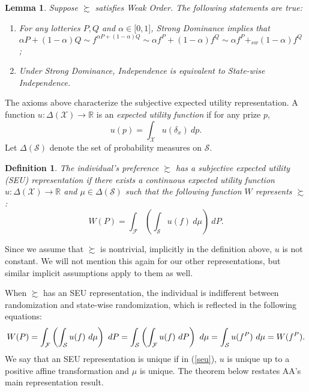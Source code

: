 \documentclass[12pt, notitlepage]{article}
\newtheorem{definition}{Definition}
\newtheorem{lemma}{Lemma}
\begin{document}
\begin{lemma}
\label{triangle}Suppose $\succsim $ satisfies Weak Order. The following
statements are true:

\begin{enumerate}
\item For any lotteries $P,Q$ and $\alpha \in \lbrack 0,1]$, Strong
Dominance implies that $\alpha P+(1-\alpha )Q\sim f^{\alpha P+(1-\alpha
)Q}\sim \alpha f^{P}+(1-\alpha )f^{Q}\sim \alpha f^{P}+_{sw}(1-\alpha )f^{Q}$%
;

\item Under Strong Dominance, Independence is equivalent to State-wise
Independence.
\end{enumerate}
\end{lemma}

The axioms above characterize the subjective expected utility
representation. A function $u:\Delta (\mathcal{X})\rightarrow \mathbb{R}$ is
an \textit{expected utility function} if for any prize $p$,%
\begin{equation*}
u(p)=\int_{\mathcal{X}}u(\delta _{x})~dp.
\end{equation*}%
Let $\Delta (\mathcal{S})$ denote the set of probability measures on $%
\mathcal{S}$.

\begin{definition}
The individual's preference $\succsim $ has a \textit{subjective expected
utility} (SEU) representation if there exists a continuous expected utility
function $u:\Delta (\mathcal{X})\rightarrow \mathbb{R}$ and $\mu \in \Delta (%
\mathcal{S})$ such that the following function $W$ represents $\succsim $:%
\begin{equation}
W(P)=\int_{\mathcal{F}}\left( \int_{\mathcal{S}}u(f)~d\mu \right) ~dP.
\label{seu}
\end{equation}
\end{definition}

Since we assume that $\succsim $ is nontrivial, implicitly in the definition
above, $u$ is not constant. We will not mention this again for our other
representations, but similar implicit assumptions apply to them as well.

When $\succsim $ has an SEU representation, the individual is indifferent
between randomization and state-wise randomization, which is reflected in
the following equations:%
\begin{equation*}
W(P)=\int_{\mathcal{F}}\left( \int_{\mathcal{S}}u(f)~d\mu \right) ~dP=\int_{%
\mathcal{S}}\left( \int_{\mathcal{F}}u(f)~dP\right) ~d\mu =\int_{\mathcal{S}%
}u(f^{P})~d\mu =W(f^{P}).
\end{equation*}%
We say that an SEU representation is unique if in (\ref{seu}), $u$ is unique
up to a positive affine transformation and $\mu $ is unique. The theorem
below restates AA's main representation result.
\end{document}
